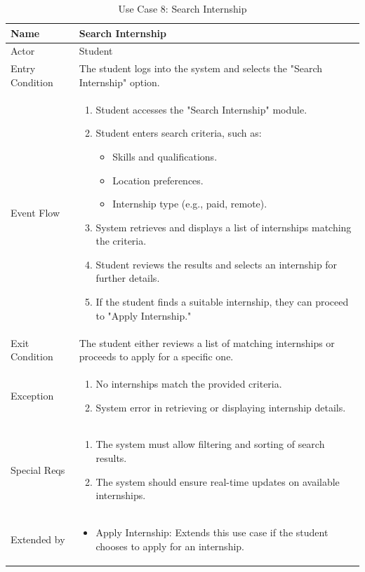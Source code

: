 \begin{table}[H]
\centering
\begin{tabular}{|l|p{12cm}|}
\hline
Name             & Search Internship \\ \hline
Actor            & Student \\ \hline
Entry Condition  & The student logs into the system and selects the "Search Internship" option. \\ \hline
Event Flow       & 
\begin{enumerate}
    \item Student accesses the "Search Internship" module.
    \item Student enters search criteria, such as:
    \begin{itemize}
        \item Skills and qualifications.
        \item Location preferences.
        \item Internship type (e.g., paid, remote).
    \end{itemize}
    \item System retrieves and displays a list of internships matching the criteria.
    \item Student reviews the results and selects an internship for further details.
    \item If the student finds a suitable internship, they can proceed to "Apply Internship."
\end{enumerate} \\ \hline
Exit Condition   & 
The student either reviews a list of matching internships or proceeds to apply for a specific one. \\ \hline
Exception        & 
\begin{enumerate}
    \item No internships match the provided criteria.
    \item System error in retrieving or displaying internship details.
\end{enumerate} \\ \hline
Special Reqs     & 
\begin{enumerate}
    \item The system must allow filtering and sorting of search results.
    \item The system should ensure real-time updates on available internships.
\end{enumerate} \\ \hline
Extended by          & 
\begin{itemize}
    \item Apply Internship: Extends this use case if the student chooses to apply for an internship.
\end{itemize} \\ \hline
\end{tabular}
\caption{Use Case 8: Search Internship}
\label{tab:search_internship}
\end{table}

